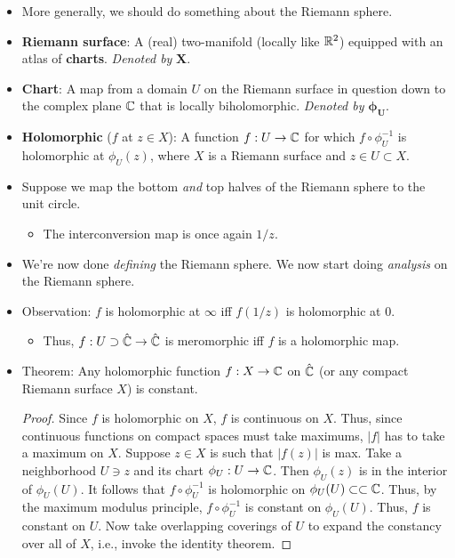 \documentclass[../notes.tex]{subfiles}
\begin{document}
\begin{itemize}
\begin{itemize}
    \end{itemize}
    \item More generally, we should do something about the Riemann sphere.
    \item \textbf{Riemann surface}: A (real) two-manifold (locally like $\mathbb{R}^2$) equipped with an atlas of \textbf{charts}. \emph{Denoted by} $\bm{X}$.
    \item \textbf{Chart}: A map from a domain $U$ on the Riemann surface in question down to the complex plane $\mathbb{C}$ that is locally biholomorphic. \emph{Denoted by} $\bm{\phi_U}$.
    \item \textbf{Holomorphic} ($f$ at $z\in X$): A function $f:U\to\mathbb{C}$ for which $f\circ\phi_U^{-1}$ is holomorphic at $\phi_U(z)$, where $X$ is a Riemann surface and $z\in U\subset X$.
    \item Suppose we map the bottom \emph{and} top halves of the Riemann sphere to the unit circle.
    \begin{itemize}
        \item The interconversion map is once again $1/z$.
    \end{itemize}
    \item We're now done \emph{defining} the Riemann sphere. We now start doing \emph{analysis} on the Riemann sphere.
    \item Observation: $f$ is holomorphic at $\infty$ iff $f(1/z)$ is holomorphic at 0.
    \begin{itemize}
        \item Thus, $f:U\supset\hat{\mathbb{C}}\to\hat{\mathbb{C}}$ is meromorphic iff $f$ is a holomorphic map.
    \end{itemize}
    \item Theorem: Any holomorphic function $f:X\to\mathbb{C}$ on $\hat{\mathbb{C}}$ (or any compact Riemann surface $X$) is constant.
    \begin{proof}
        Since $f$ is holomorphic on $X$, $f$ is continuous on $X$. Thus, since continuous functions on compact spaces must take maximums, $|f|$ has to take a maximum on $X$. Suppose $z\in X$ is such that $|f(z)|$ is max. Take a neighborhood $U\ni z$ and its chart $\phi_U:U\to\mathbb{C}$. Then $\phi_U(z)$ is in the interior of $\phi_U(U)$. It follows that $f\circ\phi_U^{-1}$ is holomorphic on $\phi_U(U)\subset\subset\mathbb{C}$. Thus, by the maximum modulus principle, $f\circ\phi_U^{-1}$ is constant on $\phi_U(U)$. Thus, $f$ is constant on $U$. Now take overlapping coverings of $U$ to expand the constancy over all of $X$, i.e., invoke the identity theorem.
    \end{proof}

\end{itemize}
\end{document}
